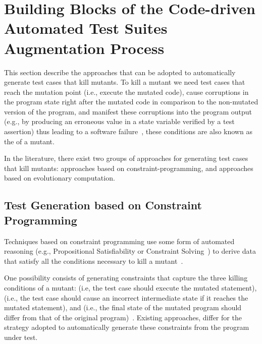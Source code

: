 \clearpage
\section{Building Blocks of the Code-driven Automated Test Suites Augmentation Process}
\label{sec:testGeneration}

This section describe the approaches that can be adopted to automatically generate test cases that kill mutants.
To kill a mutant we need test cases that reach the mutation point (i.e., execute the mutated code), cause 
corruptions
in the program state right after the mutated code in comparison to the non-mutated version of the program, 
and manifest these corruptions into the program output 
(e.g., by producing an erroneous value in a state variable verified by a test assertion) 
thus leading to a software failure~\cite{papadakis2019mutation}, these conditions are also known as the  of a mutant.

In the literature, there exist two groups of approaches for 
generating test cases that kill mutants:
approaches based on constraint-programming, and approaches based on evolutionary computation.

\subsection{Test Generation based on Constraint Programming}

Techniques based on constraint programming use some form of automated reasoning (e.g., Propositional Satisfiability or Constraint Solving~\cite{SATandCPsurvey:2006}) to derive data that satisfy all the conditions necessary to kill a mutant~\cite{offutt1997automatically}.

One possibility consists of generating constraints that capture the three killing conditions of a mutant:  (i.e, the test case should execute the mutated statement),  (i.e., the test case should cause an incorrect intermediate state if it reaches the mutated statement), and  (i.e., the final state of the mutated program should differ from that of the original program)~\cite{offutt1997automatically}. Existing approaches, differ for the strategy adopted to automatically generate these constraints from the program under test.

